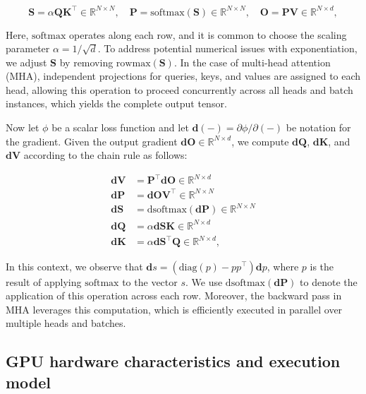 \begin{enumerate}
\begin{equation*}
  \mathbf{S} = \alpha \mathbf{Q} \mathbf{K}^\top \in \mathbb{R}^{N \times N}, \quad \mathbf{P} = \mathrm{softmax}(\mathbf{S}) \in \mathbb{R}^{N \times N}, \quad \mathbf{O} = \mathbf{P}\mathbf{V} \in \mathbb{R}^{N \times d},
\end{equation*}

Here, $\mathrm{softmax}$ operates along each row, and it is common to choose the scaling parameter $\alpha = 1/\sqrt{d}$. To address potential numerical issues with exponentiation, we adjust $\mathbf{S}$ by removing $\mathrm{rowmax}(\mathbf{S})$. In the case of multi-head attention (MHA), independent projections for queries, keys, and values are assigned to each head, allowing this operation to proceed concurrently across all heads and batch instances, which yields the complete output tensor.

Now let $\phi$ be a scalar loss function and let $\mathbf{d}(-) = \partial \phi / \partial (-)$ be notation for the gradient. Given the output gradient $\mathbf{dO} \in \mathbb{R}^{N \times d}$, we compute $\mathbf{dQ}$, $\mathbf{dK}$, and $\mathbf{dV}$ according to the chain rule as follows:

\begin{align*}
  \mathbf{dV} &= \mathbf{P}^\top \mathbf{dO} \in \mathbb{R}^{N \times d} \\
  \mathbf{dP} &= \mathbf{dO} \mathbf{V}^\top \in \mathbb{R}^{N \times N} \\
  \mathbf{dS} &= \mathrm{dsoftmax} (\mathbf{dP}) \in \mathbb{R}^{N \times N} \\
  \mathbf{dQ} &= \alpha \mathbf{dS} \mathbf{K} \in \mathbb{R}^{N \times d} \\
  \mathbf{dK} &= \alpha \mathbf{dS}^\top \mathbf{Q} \in \mathbb{R}^{N \times d},
\end{align*}

In this context, we observe that $\mathbf{d}s = (\mathrm{diag}(p) - p p^\top)\mathbf{d}p$, where $p$ is the result of applying $\mathrm{softmax}$ to the vector $s$. We use $\mathrm{dsoftmax}(\mathbf{dP})$ to denote the application of this operation across each row. Moreover, the backward pass in MHA leverages this computation, which is efficiently executed in parallel over multiple heads and batches.

\subsection{GPU hardware characteristics and execution model}
\label{subsec:hardware}


\end{enumerate}
